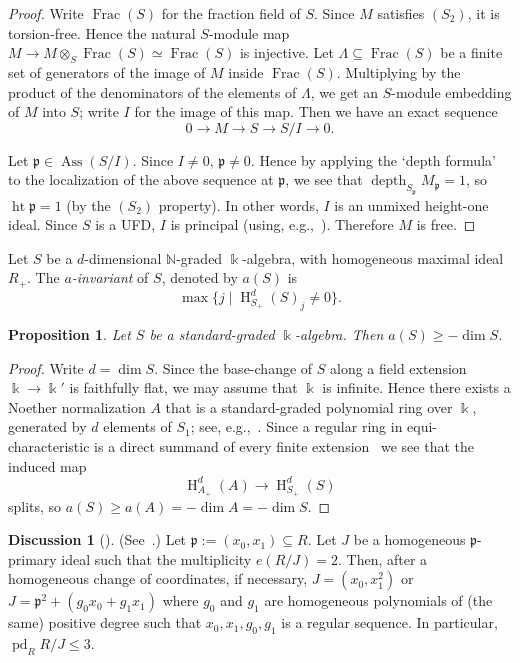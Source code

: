 \documentclass[11pt,a4paper]{amsart}
\theoremstyle{plain}
\newtheorem{proposition}[equation]{Proposition}
\theoremstyle{definition}
\newtheorem{discussion}[equation]{Discussion}
\newenvironment{discussionbox}[1][]{%
    \begin{discussion}[#1]\pushQED{\qed}}{\popQED \end{discussion}}
\newcommand{\frakp}{{\mathfrak p}}
\newcommand{\naturals}{\mathbb{N}}
\DeclareMathOperator{\projdim}{pd}
\DeclareMathOperator{\height}{ht}
\DeclareMathOperator{\depth}{depth}
\DeclareMathOperator{\homology}{H}
\newcommand{\define}[1]{\emph{#1}}
\DeclareMathOperator{\Ass}{Ass}
\DeclareMathOperator{\Frac}{Frac}
\begin{document}
\begin{proof}
%
Write $\Frac(S)$ for the fraction field of $S$.
Since $M$ satisfies $(S_2)$, it is torsion-free. Hence the natural
$S$-module map $M \to M  \otimes_S \Frac(S) \simeq \Frac(S)$ is injective. 
Let $\Lambda \subseteq \Frac(S)$ be a finite set of generators of the image
of $M$ inside $\Frac(S)$. Multiplying by the product of the denominators of
the elements of $\Lambda$, we get an $S$-module embedding of $M$ into $S$;
write $I$ for the image of this map.
Then we have an exact sequence
\[
0 \to M \to S \to S/I \to 0.
\]

Let $\frakp \in \Ass (S/I)$. Since $I \neq 0$, $\frakp \neq 0$.
Hence by applying the `depth formula'~\cite[Proposition~1.2.9]{BrHe:CM}
to the localization of the above sequence at $\frakp$, we see that
$\depth_{S_\frakp } M_\frakp = 1$, so $\height \frakp = 1$ (by the $(S_2)$
property). In other words, $I$ is an unmixed height-one ideal. Since $S$ is
a UFD, $I$ is principal (using, e.g.,~\cite[Corollary~10.6]{eiscommalg}).
Therefore $M$ is free.
\end{proof}

Let $S$ be a $d$-dimensional $\naturals$-graded $\Bbbk$-algebra, with
homogeneous maximal ideal $R_+$. The \define{$a$-invariant} of $S$, denoted
by $a(S)$ is
\[
\max\{j \mid \homology^d_{S_+}(S)_j \neq 0 \}.
\]

\begin{proposition}
\label{proposition:aInvDim}
Let $S$ be a standard-graded $\Bbbk$-algebra.
Then $a(S) \geq -\dim S$.
\end{proposition}

\begin{proof}
%
Write $d = \dim S$.
Since the base-change of $S$ along a field extension $\Bbbk \to \Bbbk'$ is
faithfully flat, we may assume that $\Bbbk$ is infinite.
Hence there exists a Noether normalization $A$ that is a standard-graded
polynomial ring over $\Bbbk$, generated by $d$ elements of $S_1$; see,
e.g.,~\cite[Theorem~13.3]{eiscommalg}.
Since a regular ring in equi-characteristic is a direct summand of every
finite extension~\cite{HochsterContracted1973} we see that the induced map
\[
\homology^d_{A_+}(A) \to \homology^d_{S_+}(S)
\]
splits, so $a(S) \geq a(A) = - \dim A = -\dim S$.
\end{proof}

\begin{discussionbox}
\label{discussionbox:engheta}
(See~\cite[Proposition~11]{EnghetaPDUnmThreeCubics2007}.)
Let $\frakp := (x_0, x_1) \subseteq R$. Let $J$ be a homogeneous
$\frakp$-primary ideal such that the multiplicity $e(R/J) = 2$.
Then, after a homogeneous change of coordinates, if necessary, 
$J = (x_0, x_1^2)$ or $J =  \frakp^2 + (g_0x_0 + g_1x_1)$
where $g_0$ and $g_1$ are homogeneous polynomials of (the same)
positive degree such that $x_0, x_1, g_0, g_1$ is a regular sequence.
In particular, $\projdim_R R/J \leq 3$.
\end{discussionbox}
\end{document}
